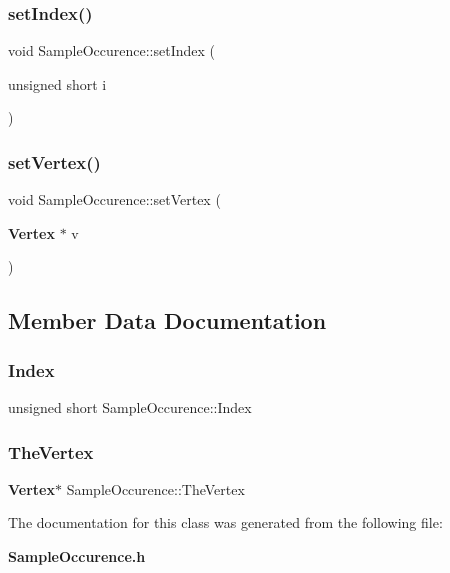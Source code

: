 \subsubsection{set\+Index()}
{\footnotesize\ttfamily void Sample\+Occurence\+::set\+Index (\begin{DoxyParamCaption}\item[{unsigned short}]{i }\end{DoxyParamCaption})\hspace{0.3cm}{\ttfamily [inline]}}

\mbox{\label{classSampleOccurence_a4530e3254a60e0fbb8ccd9c294c87b09}} 
\subsubsection{set\+Vertex()}
{\footnotesize\ttfamily void Sample\+Occurence\+::set\+Vertex (\begin{DoxyParamCaption}\item[{\textbf{ Vertex} $\ast$}]{v }\end{DoxyParamCaption})\hspace{0.3cm}{\ttfamily [inline]}}



\subsection{Member Data Documentation}
\mbox{\label{classSampleOccurence_a153057d59c6d115708162cd33f7763d0}} 
\subsubsection{Index}
{\footnotesize\ttfamily unsigned short Sample\+Occurence\+::\+Index\hspace{0.3cm}{\ttfamily [private]}}

\mbox{\label{classSampleOccurence_acf899040ebb4f1ad34c01c6ea6cb1f78}} 
\subsubsection{The\+Vertex}
{\footnotesize\ttfamily \textbf{ Vertex}$\ast$ Sample\+Occurence\+::\+The\+Vertex\hspace{0.3cm}{\ttfamily [private]}}



The documentation for this class was generated from the following file\+:\begin{DoxyCompactItemize}
\item 
\textbf{ Sample\+Occurence.\+h}\end{DoxyCompactItemize}
